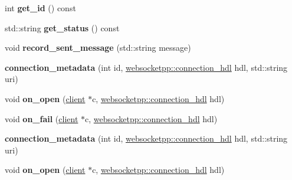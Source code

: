 \begin{DoxyCompactItemize}
int {\bfseries get\+\_\+id} () const
\item 
\mbox{\label{classconnection__metadata_aefe28a6b0b27076c685d66727e0f0a9d}} 
std\+::string {\bfseries get\+\_\+status} () const
\item 
\mbox{\label{classconnection__metadata_aa6940efad5f50a3e4f9789d51ebbea75}} 
void {\bfseries record\+\_\+sent\+\_\+message} (std\+::string message)
\item 
\mbox{\label{classconnection__metadata_ab73db2e336676ec4efa4d4dc5051958f}} 
{\bfseries connection\+\_\+metadata} (int id, \mbox{\hyperlink{namespacewebsocketpp_a6b3d26a10ee7229b84b776786332631d}{websocketpp\+::connection\+\_\+hdl}} hdl, std\+::string uri)
\item 
\mbox{\label{classconnection__metadata_ab10d997bd75d9e98b235b7e97b84b85a}} 
void {\bfseries on\+\_\+open} (\mbox{\hyperlink{classwebsocketpp_1_1client}{client}} $\ast$c, \mbox{\hyperlink{namespacewebsocketpp_a6b3d26a10ee7229b84b776786332631d}{websocketpp\+::connection\+\_\+hdl}} hdl)
\item 
\mbox{\label{classconnection__metadata_a1c2e652001b8306207beafe17b1a52ed}} 
void {\bfseries on\+\_\+fail} (\mbox{\hyperlink{classwebsocketpp_1_1client}{client}} $\ast$c, \mbox{\hyperlink{namespacewebsocketpp_a6b3d26a10ee7229b84b776786332631d}{websocketpp\+::connection\+\_\+hdl}} hdl)
\item 
\mbox{\label{classconnection__metadata_ab73db2e336676ec4efa4d4dc5051958f}} 
{\bfseries connection\+\_\+metadata} (int id, \mbox{\hyperlink{namespacewebsocketpp_a6b3d26a10ee7229b84b776786332631d}{websocketpp\+::connection\+\_\+hdl}} hdl, std\+::string uri)
\item 
\mbox{\label{classconnection__metadata_ab10d997bd75d9e98b235b7e97b84b85a}} 
void {\bfseries on\+\_\+open} (\mbox{\hyperlink{classwebsocketpp_1_1client}{client}} $\ast$c, \mbox{\hyperlink{namespacewebsocketpp_a6b3d26a10ee7229b84b776786332631d}{websocketpp\+::connection\+\_\+hdl}} hdl)
\item 
\mbox{\label{classconnection__metadata_a1c2e652001b8306207beafe17b1a52ed}} 

\end{DoxyCompactItemize}
